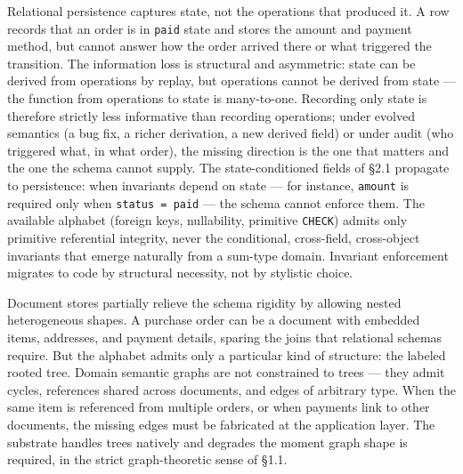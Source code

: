 \documentclass[
]{article}
\let\origtexttt\texttt%
\renewcommand{\texttt}[1]{\origtexttt{\seqsplit{#1}}}%
\let\texttt\origtexttt%
\begin{document}
Relational persistence captures state, not the operations that produced
it. A row records that an order is in \texttt{paid} state and stores the
amount and payment method, but cannot answer how the order arrived there
or what triggered the transition. The information loss is structural and
asymmetric: state can be derived from operations by replay, but
operations cannot be derived from state --- the function from operations
to state is many-to-one. Recording only state is therefore strictly less
informative than recording operations; under evolved semantics (a bug
fix, a richer derivation, a new derived field) or under audit (who
triggered what, in what order), the missing direction is the one that
matters and the one the schema cannot supply. The state-conditioned
fields of §2.1 propagate to persistence: when invariants depend on state
--- for instance, \texttt{amount} is required only when
\texttt{status\ =\ paid} --- the schema cannot enforce them. The
available alphabet (foreign keys, nullability, primitive \texttt{CHECK})
admits only primitive referential integrity, never the conditional,
cross-field, cross-object invariants that emerge naturally from a
sum-type domain. Invariant enforcement migrates to code by structural
necessity, not by stylistic choice.

Document stores partially relieve the schema rigidity by allowing nested
heterogeneous shapes. A purchase order can be a document with embedded
items, addresses, and payment details, sparing the joins that relational
schemas require. But the alphabet admits only a particular kind of
structure: the labeled rooted tree. Domain semantic graphs are not
constrained to trees --- they admit cycles, references shared across
documents, and edges of arbitrary type. When the same item is referenced
from multiple orders, or when payments link to other documents, the
missing edges must be fabricated at the application layer. The substrate
handles trees natively and degrades the moment graph shape is required,
in the strict graph-theoretic sense of §1.1.
\end{document}
